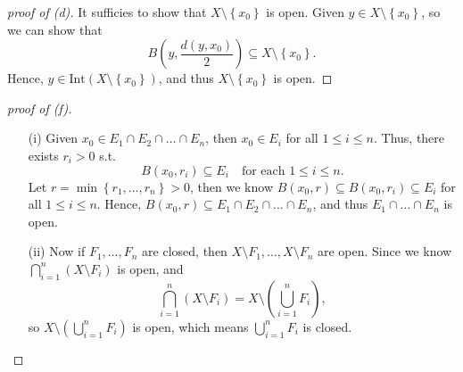 \begin{proof}[proof of (d)]
    It sufficies to show that \(X \setminus \left\{ x_0 \right\} \) is open. Given \(y \in X \setminus \left\{ x_0 \right\} \), so we can show that 
    \[
        B\left( y, \frac{d(y,x_0)}{2} \right) \subseteq X \setminus \left\{ x_0 \right\}. 
    \]
    Hence, \(y \in \mathrm{Int}(X \setminus \left\{ x_0 \right\} ) \), and thus \(X \setminus \left\{ x_0 \right\} \) is open.  
\end{proof}
\begin{proof}[proof of (f)]
    \vphantom{text}
    \begin{itemize}
        \item [(i)] Given \(x_0 \in E_1 \cap E_2 \cap \dots \cap E_n\), then \(x_0 \in E_i\) for all \(1 \le i \le n\). Thus, there exists \(r_i > 0\) s.t. 
    \[
        B(x_0, r_i) \subseteq E_i \quad \text{for each } 1 \le i \le n.
    \]   Let \(r = \min \left\{ r_1, \dots , r_n \right\} > 0\), then we know \(B(x_0, r) \subseteq B(x_0, r_i) \subseteq E_i\) for all \(1 \le i \le n\). Hence, \(B(x_0, r) \subseteq E_1 \cap E_2 \cap \dots \cap E_n\), and thus \(E_1 \cap \dots \cap E_n\) is open.
        \item [(ii)] Now if \(F_1, \dots , F_n\) are closed, then \(X\setminus F_1, \dots , X\setminus F_n\) are open. Since we know \(\bigcap_{i=1}^{n} (X \setminus F_i) \) is open, and 
    \[
        \bigcap_{i=1}^n \left( X \setminus F_i \right) = X \setminus \left( \bigcup_{i=1}^n F_i  \right),   
    \]
    so \(X\setminus \left( \bigcup_{i=1}^{n}F_i \right)  \) is open, which means \(\bigcup_{i=1}^{n}F_i\) is closed.
    \end{itemize}        
\end{proof}

